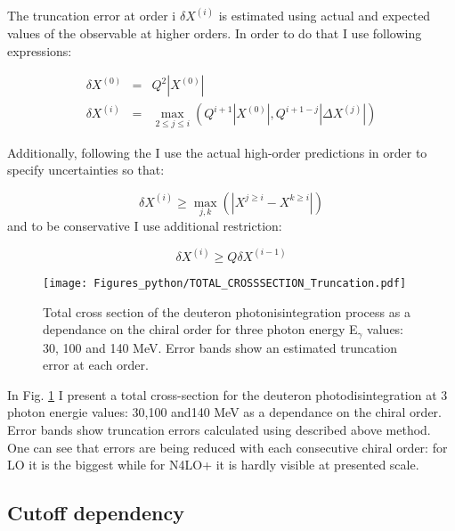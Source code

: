     The truncation error at order i $\delta X^{(i)}$ is estimated using actual and expected values of the observable at 
    higher orders. In order to do that I use following expressions:

    \begin{eqnarray}
        \delta X^{(0)} &=& Q^2 \left| X^{(0)} \right| \label{trunc2}\\ 
        \delta X^{(i)} &=& \max_{2 \leq j \leq i} \left( Q^{i+1} \left| X^{(0)} \right|,
        Q^{i+1-j} \left| \Delta X^{(j)} \right| \right) \label{trunc3} 
    \end{eqnarray}

    Additionally, following the \cite{Binder2015} I use the actual high-order predictions 
    in order to specify uncertainties so that:

    \begin{equation}
        \delta X^{(i)} \geq \max_{j,k} (|X^{j \geq i} - X^{k \geq i}|)
        \label{trunc4}
    \end{equation}
    and to be conservative I use additional restriction:

    \begin{equation}
        \delta X^{(i)} \geq Q \delta X^{(i-1)}
        \label{trunc5}
    \end{equation}

    
    \begin{figure}[h]
        \begin{center}
            \texttt{[image: Figures\_python/TOTAL\_CROSSSECTION\_Truncation.pdf]}
        \end{center}
        \caption{Total cross section of the deuteron photonisintegration
        process as a dependance on the chiral order for three photon energy E$_\gamma$ values: 30, 100 and 140 MeV.
        Error bands show an estimated truncation error at each order.}
        \label{Trunc_100}
    \end{figure}
    
    In Fig. \ref{Trunc_100} I present a total cross-section for the deuteron photodisintegration 
    at 3 photon energie values: 30,100 and140 MeV as a dependance on the chiral order.
    Error bands show truncation errors calculated using described above method.
    One can see that errors are being reduced with each consecutive chiral order: for LO it is the biggest
    while for N4LO+ it is hardly visible at presented scale.


    \subsection*{Cutoff dependency}



